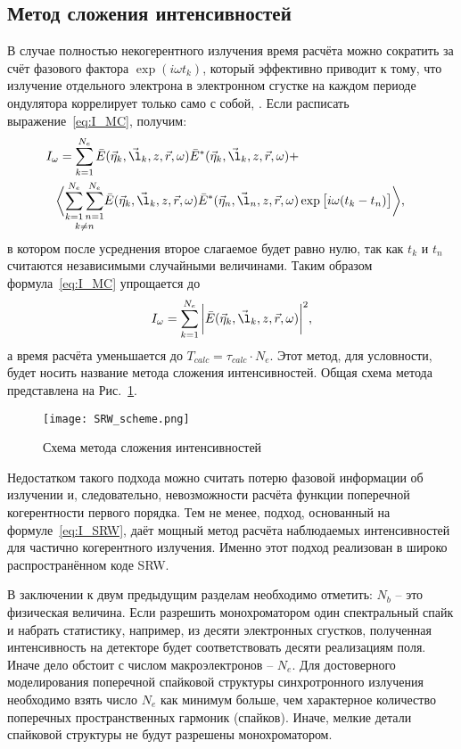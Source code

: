\subsection{Метод сложения интенсивностей}
В случае полностью некогерентного излучения время расчёта можно сократить за счёт фазового фактора $\exp{(i \omega t_k)}$, который эффективно приводит к тому, что излучение отдельного электрона в электронном сгустке на каждом периоде ондулятора коррелирует только само с собой, \cite{geloni_transverse_2008}. Если расписать выражение~\ref{eq:I_MC}, получим: 
\begin{align}
	I_{\omega} = \sum\limits_{k=1}^{N_e} \bar{E}(\vec{\eta}_k, \vec{\l}_k, z, \vec{r}, \omega)\bar{E}^{*}(\vec{\eta}_k, \vec{\l}_k, z, \vec{r}, \omega) + \cr
	\bigg \langle \underset{k \neq n}{\sum\limits_{k=1}^{N_e} \sum\limits_{n=1}^{N_e}} \bar{E}(\vec{\eta}_k, \vec{\l}_k, z, \vec{r}, \omega)\bar{E}^{*}(\vec{\eta}_n, \vec{\l}_n, z, \vec{r}, \omega) & \exp{\big[i \omega (t_k - t_n)\big]}\bigg \rangle,
	\label{eq:I_SRW_with_explicit_sum} 
\end{align}
в котором после усреднения второе слагаемое будет равно нулю, так как $t_k$ и $t_n$ считаются независимыми случайными величинами. Таким образом формула~\ref{eq:I_MC} упрощается до 
\begin{align}
 	I_{\omega} = \sum\limits_{k=1}^{N_e} \bigg|\bar{E}(\vec{\eta}_k, \vec{\l}_k, z, \vec{r}, \omega)\bigg|^2,
 	\label{eq:I_SRW} 
\end{align}
а время расчёта уменьшается до $T_{calc} = \tau_{calc} \cdot N_e$. Этот метод, для условности, будет носить название метода сложения интенсивностей. Общая схема метода представлена на Рис.~\ref{fig:SRW_scheme}.
\begin{figure}[H] 
	\centering 	\texttt{[image: SRW\_scheme.png]}
	\caption{Схема метода сложения интенсивностей}
	\label{fig:SRW_scheme}
\end{figure}
\noindent  Недостатком такого подхода можно считать потерю фазовой информации об излучении и, следовательно, невозможности расчёта функции поперечной когерентности первого порядка. Тем не менее, подход, основанный на формуле~\ref{eq:I_SRW}, даёт мощный метод расчёта наблюдаемых интенсивностей для частично когерентного излучения. Именно этот подход реализован в широко распространённом коде SRW.

В заключении к двум предыдущим разделам необходимо отметить: $N_b$ -- это физическая величина. Если разрешить монохроматором один спектральный спайк и набрать статистику, например, из десяти электронных сгустков, полученная интенсивность на детекторе будет соответствовать десяти реализациям поля. Иначе дело обстоит с числом макроэлектронов -- $N_e$. Для достоверного моделирования поперечной спайковой структуры синхротронного излучения необходимо взять число $N_e$ как минимум больше, чем характерное количество поперечных пространственных гармоник (спайков). Иначе, мелкие детали спайковой структуры не будут  разрешены монохроматором.
  
